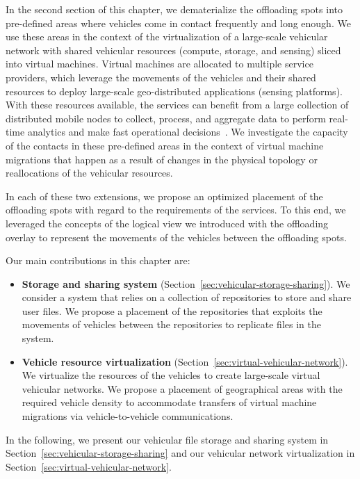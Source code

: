 In the second section of this chapter, we dematerialize the offloading spots into pre-defined areas where vehicles come in contact frequently and long enough. We use these areas in the context of the virtualization of a large-scale vehicular network with shared vehicular resources (\eg compute, storage, and sensing) sliced into virtual machines. Virtual machines are allocated to multiple service providers, which leverage the movements of the vehicles and their shared resources to deploy large-scale geo-distributed applications (\eg sensing platforms). With these resources available, the services can benefit from a large collection of distributed mobile nodes to collect, process, and aggregate data to perform real-time analytics and make fast operational decisions~\cite{bonomi2012fog}. We investigate the capacity of the contacts in these pre-defined areas in the context of virtual machine migrations that happen as a result of changes in the physical topology or reallocations of the vehicular resources.

In each of these two extensions, we propose an optimized placement of the offloading spots with regard to the requirements of the services. To this end, we leveraged the concepts of the logical view we introduced with the offloading overlay to represent the movements of the vehicles between the offloading spots. 

Our main contributions in this chapter are:
\begin{itemize}
    
    \item \textbf{Storage and sharing system} (Section~\ref{sec:vehicular-storage-sharing}). We consider a system that relies on a collection of repositories to store and share user files. We propose a placement of the repositories that exploits the movements of vehicles between the repositories to replicate files in the system.
    
    \item \textbf{Vehicle resource virtualization} (Section~\ref{sec:virtual-vehicular-network}). We virtualize the resources of the vehicles to create large-scale virtual vehicular networks. We propose a placement of geographical areas with the required vehicle density to accommodate transfers of virtual machine migrations via vehicle-to-vehicle communications.

\end{itemize}

In the following, we present our vehicular file storage and sharing system in Section~\ref{sec:vehicular-storage-sharing} and our vehicular network virtualization in Section~\ref{sec:virtual-vehicular-network}.

